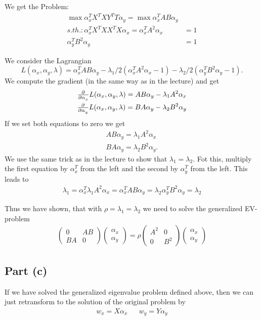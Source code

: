We get the Problem:
\begin{align*}
	\max \alpha_x^T X^T X Y^T T \alpha_y = \max \alpha_x^T AB \alpha_y& \\
	s.th.: \alpha_x^T X^TXX^TX \alpha_x =  \alpha_x^T A^2 \alpha_x &= 1 \\
	\alpha_y^T B^2 \alpha_y &= 1
\end{align*}

We consider the Lagrangian
\begin{equation*}
	L(\alpha_x, \alpha_y, \lambda) =  \alpha_x^T AB \alpha_y - \lambda_1/2 (\alpha_x^T A^2 \alpha_x - 1) - \lambda_2/2(	\alpha_y^T B^2 \alpha_y -1).
\end{equation*}
We compute the gradient (in the same way as in the lecture) and get
\begin{align*}
	\pd{}{\alpha_x} 	L(\alpha_x, \alpha_y, \lambda) = AB\alpha_y - \lambda_1A^2 \alpha_x \\
	\pd{}{\alpha_y} 	L(\alpha_x, \alpha_y, \lambda) = BA\alpha_y - \lambda_2B^2 \alpha_y 
\end{align*}
If we set both equations to zero we get
\begin{align*}
	AB\alpha_y = \lambda_1A^2 \alpha_x \\
	BA\alpha_y = \lambda_2B^2 \alpha_y.
\end{align*}
We use the same trick as in the lecture to show that $\lambda_1 = \lambda_2$. Fot this, multiply the first equation by $\alpha_x^T$ from the left and the second by $\alpha_y^T$ from the left.
This leads to
\begin{align*}
	\lambda_1 =	\alpha_x^T \lambda_1A^2 \alpha_x = \alpha_x^T AB \alpha_y = \lambda_2	\alpha_y^T B^2 \alpha_y = \lambda_2
\end{align*}

Thus we have shown, that with $\rho = \lambda_1 = \lambda_2$ we need to solve the generalized EV- problem
\begin{align*}
	\begin{pmatrix}
	0 & AB \\
	BA & 0
	\end{pmatrix} \begin{pmatrix}
	\alpha_x \\ \alpha_y
	\end{pmatrix}
	= \rho 
	\begin{pmatrix}
	A^2 & 0 \\
	0 & B^2 
	\end{pmatrix}
	\begin{pmatrix}
	\alpha_x \\ \alpha_y
	\end{pmatrix}
\end{align*}

\subsection*{Part (c)}

If we have solved the generalized eigenvalue problem defined above, then we can just retransform to the solution of the original problem by
\begin{align*}
	w_x = X \alpha_x && w_y = Y\alpha_y
\end{align*}